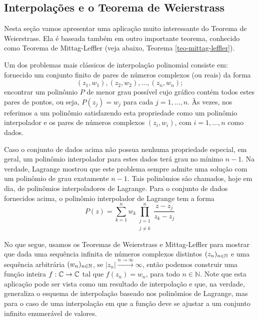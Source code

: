     \subsection{Interpolações e o Teorema de Weierstrass}
    
    
    Nesta seção vamos apresentar uma aplicação muito 
    interessante do Teorema de Weierstrass. 
    Ela é baseada também em outro importante teorema, 
    conhecido como Teorema de Mittag-Leffler 
    (veja abaixo, Teorema \ref{teo-mittag-leffler}). 
    
    
    Um dos problemas mais clássicos de 
    interpolação polinomial consiste em: 
    fornecido um conjunto finito de pares 
    de números complexos (ou reais) da forma
    \[
    (z_1,w_1), (z_2,w_2), \ldots, (z_n,w_n);
    \]
    encontrar um polinômio $P$ de menor grau possível 
    cujo gráfico contém todos estes pares de pontos, 
    ou seja, $P(z_j)=w_j$ para cada $j=1,\ldots,n$. 
    Às vezes, nos referimos a um polinômio 
    satisfazendo esta propriedade como um 
    polinômio interpolador e os pares de
    números complexos $(z_i,w_i)$, com $i=1,\ldots,n$ como dados.
    
    Caso o conjunto de dados acima não possua nenhuma propriedade especial, em geral, um 
    polinômio interpolador para estes dados 
    terá grau no mínimo $n-1$. 
    Na verdade, Lagrange mostrou
    que este problema sempre 
    admite uma solução com um polinômio de grau exatamente $n-1$. 
    Tais polinômios são chamados, hoje em dia, 
    de polinômios interpoladores de Lagrange. 
    Para o conjunto de dados fornecidos acima, 
    o polinômio interpolador de Lagrange tem a forma 
    \[
      P(z)
      =
      \sum_{k=1}^n 
      w_k
      \prod_{\substack{j=1 \\ j\neq k}}^n
      \frac{z-z_j}{z_k-z_j}
    \]
    
    No que segue, usamos os Teoremas 
    de Weierstrass e Mittag-Leffler para mostrar que dada
    uma sequência infinita de números complexos 
    distintos $(z_n)_{n\in\mathbb{N}}$ e uma sequência arbitrária
    $(w_n)_{n\in\mathbb{N}}$, se $|z_n|\xrightarrow{n\to\infty}\infty$, 
    então podemos construir uma
    função inteira $f:\mathbb{C}\to\mathbb{C}$ tal que 
    $f(z_n)=w_n$, para todo $n\in\mathbb{N}$.
    Note que esta aplicação pode ser vista 
    como um resultado de interpolação e que, na verdade, 
    generaliza o esquema de interpolação baseado nos 
    polinômios de Lagrange, mas
    para o caso de uma interpolação 
    em que a função deve se ajustar a um 
    conjunto infinito enumerável de valores. 
    

